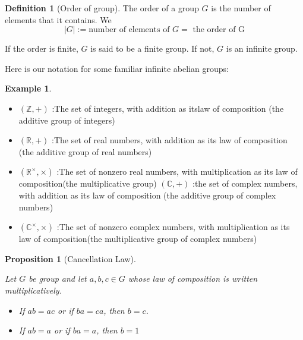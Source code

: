 \documentclass[
]{book}
\providecommand{\tightlist}{%
  \setlength{\itemsep}{0pt}\setlength{\parskip}{0pt}}
\newtheorem{proposition}{Proposition}[chapter]
\theoremstyle{definition}
\newtheorem{definition}{Definition}[chapter]
\theoremstyle{definition}
\newtheorem{example}{Example}[chapter]
\theoremstyle{definition}
\theoremstyle{definition}
\theoremstyle{remark}
\begin{document}
\begin{definition}[Order of group]
\protect\hypertarget{def:unnamed-chunk-7}{}\label{def:unnamed-chunk-7}The order of a group \(G\) is the number of elements that it contains. We \[| G | := \text{number of elements of }G=\text{ the order of G}\]

If the order is finite, \(G\) is said to be a finite group. If not, \(G\) is an infinite group.
\end{definition}

Here is our notation for some familiar infinite abelian groups:

\begin{example}
\protect\hypertarget{exm:unnamed-chunk-8}{}\label{exm:unnamed-chunk-8}\leavevmode

\begin{itemize}
\tightlist
\item
  \((\mathbb{Z},+)\) :The set of integers, with addition as itslaw of composition (the additive group of integers)
\item
  \((\mathbb{R},+)\) :The set of real numbers, with addition as its law of
  composition (the additive group of real numbers)
\item
  \((\mathbb{R}^\times,\times)\) :The set of nonzero real numbers, with multiplication as its law of composition(the multiplicative group)
  \((\mathbb{C},+)\) :the set of complex numbers, with addition as its law of composition (the additive group of complex numbers)
\item
  \((\mathbb{C}^\times,\times)\) :The set of nonzero complex numbers, with multiplication as its law of composition(the multiplicative group of complex numbers)
\end{itemize}

\end{example}

\begin{proposition}[Cancellation Law]
\protect\hypertarget{prp:unnamed-chunk-9}{}\label{prp:unnamed-chunk-9}

Let \(G\) be group and let \(a, b, c \in G\) whose law of composition is written multiplicatively.

\begin{itemize}
\tightlist
\item
  If \(ab = ac\) or if \(ba = ca\), then \(b = c\).
\item
  If \(a b = a\) or if \(ba = a\), then \(b = 1\)
\end{itemize}

\end{proposition}
\end{document}
